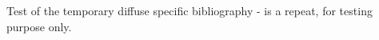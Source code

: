\documentclass[aps,pre,preprint,groupedaddress, floatfix]{revtex4-1}
\begin{document}



Test of the temporary diffuse specific bibliography - 
is a repeat, for testing purpose only.


\PublicPrivate{}{%

      }%
\end{document}
